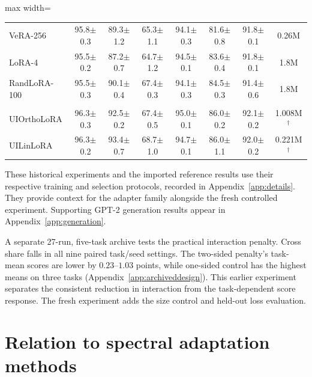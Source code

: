 \documentclass{article}
\begin{document}
\begin{table}[t]
\begin{adjustbox}{max width=\linewidth}
\begin{tabular}{@{}lccccccc@{}}
VeRA-256 & 95.8{\scriptsize$\pm$0.3} & 89.3{\scriptsize$\pm$1.2} & 65.3{\scriptsize$\pm$1.1} & 94.1{\scriptsize$\pm$0.3} & 81.6{\scriptsize$\pm$0.8} & 91.8{\scriptsize$\pm$0.1} & 0.26M \\
LoRA-4 & 95.5{\scriptsize$\pm$0.2} & 87.2{\scriptsize$\pm$0.7} & 64.7{\scriptsize$\pm$1.2} & 94.5{\scriptsize$\pm$0.1} & 83.6{\scriptsize$\pm$0.4} & 91.8{\scriptsize$\pm$0.1} & 1.8M \\
RandLoRA-100 & 95.5{\scriptsize$\pm$0.3} & 90.1{\scriptsize$\pm$0.4} & 67.4{\scriptsize$\pm$0.3} & 94.1{\scriptsize$\pm$0.3} & 84.5{\scriptsize$\pm$0.3} & 91.4{\scriptsize$\pm$0.6} & 1.8M \\
\addlinespace
\multicolumn{8}{l}{\textit{Spectral instruments (reported protocol; six seeds)}} \\
UIOrthoLoRA & 96.3{\scriptsize$\pm$0.3} & 92.5{\scriptsize$\pm$0.2} & 67.4{\scriptsize$\pm$0.5} & 95.0{\scriptsize$\pm$0.1} & 86.0{\scriptsize$\pm$0.2} & 92.1{\scriptsize$\pm$0.2} & 1.008M$^{\dagger}$ \\
UILinLoRA & 96.3{\scriptsize$\pm$0.2} & 93.4{\scriptsize$\pm$0.7} & 68.7{\scriptsize$\pm$1.0} & 94.7{\scriptsize$\pm$0.1} & 86.0{\scriptsize$\pm$1.1} & 92.0{\scriptsize$\pm$0.2} & 0.221M$^{\dagger}$ \\
\bottomrule
\end{tabular}
\end{adjustbox}
\end{table}

These historical experiments and the imported reference results use their respective training and selection protocols, recorded in Appendix~\ref{app:details}. They provide context for the adapter family alongside the fresh controlled experiment. Supporting GPT-2 generation results appear in Appendix~\ref{app:generation}.

A separate 27-run, five-task archive tests the practical interaction penalty. Cross share falls in all nine paired task/seed settings. The two-sided penalty's task-mean scores are lower by $0.23$--$1.03$ points, while one-sided control has the highest means on three tasks (Appendix~\ref{app:archiveddesign}). This earlier experiment separates the consistent reduction in interaction from the task-dependent score response. The fresh experiment adds the size control and held-out loss evaluation.

\section{Relation to spectral adaptation methods}
\label{sec:related}
\end{document}
